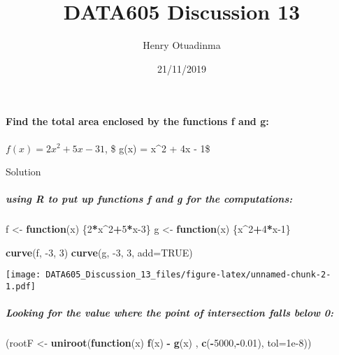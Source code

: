 \documentclass[]{article}
\title{DATA605 Discussion 13}
\author{Henry Otuadinma}
\date{21/11/2019}
\newenvironment{Shaded}{\begin{snugshade}}{\end{snugshade}}
\newcommand{\ControlFlowTok}[1]{\textcolor[rgb]{0.13,0.29,0.53}{\textbf{#1}}}
\newcommand{\DataTypeTok}[1]{\textcolor[rgb]{0.13,0.29,0.53}{#1}}
\newcommand{\DecValTok}[1]{\textcolor[rgb]{0.00,0.00,0.81}{#1}}
\newcommand{\FloatTok}[1]{\textcolor[rgb]{0.00,0.00,0.81}{#1}}
\newcommand{\KeywordTok}[1]{\textcolor[rgb]{0.13,0.29,0.53}{\textbf{#1}}}
\newcommand{\NormalTok}[1]{#1}
\newcommand{\OperatorTok}[1]{\textcolor[rgb]{0.81,0.36,0.00}{\textbf{#1}}}
\newcommand{\OtherTok}[1]{\textcolor[rgb]{0.56,0.35,0.01}{#1}}
\newcommand{\StringTok}[1]{\textcolor[rgb]{0.31,0.60,0.02}{#1}}
\let\oldparagraph\paragraph
\renewcommand{\paragraph}[1]{\oldparagraph{#1}\mbox{}}
\let\oldsubparagraph\subparagraph
\renewcommand{\subparagraph}[1]{\oldsubparagraph{#1}\mbox{}}
\begin{document}
\maketitle

\hypertarget{find-the-total-area-enclosed-by-the-functions-f-and-g}{%
\paragraph{Find the total area enclosed by the functions f and
g:}\label{find-the-total-area-enclosed-by-the-functions-f-and-g}}

\(f(x) = 2x^2 + 5x - 31\), \$ g(x) = x\^{}2 + 4x - 1\$

Solution

\hypertarget{using-r-to-put-up-functions-f-and-g-for-the-computations}{%
\subparagraph{using R to put up functions f and g for the
computations:}\label{using-r-to-put-up-functions-f-and-g-for-the-computations}}

\begin{Shaded}
\begin{Highlighting}[]
\NormalTok{f <-}\StringTok{ }\ControlFlowTok{function}\NormalTok{(x) \{}\DecValTok{2}\OperatorTok{*}\NormalTok{x}\OperatorTok{^}\DecValTok{2}\OperatorTok{+}\DecValTok{5}\OperatorTok{*}\NormalTok{x}\DecValTok{-3}\NormalTok{\}}
\NormalTok{g <-}\StringTok{ }\ControlFlowTok{function}\NormalTok{(x) \{x}\OperatorTok{^}\DecValTok{2}\OperatorTok{+}\DecValTok{4}\OperatorTok{*}\NormalTok{x}\DecValTok{-1}\NormalTok{\}}
\end{Highlighting}
\end{Shaded}

\begin{Shaded}
\begin{Highlighting}[]
\KeywordTok{curve}\NormalTok{(f, }\DecValTok{-3}\NormalTok{, }\DecValTok{3}\NormalTok{)}
\KeywordTok{curve}\NormalTok{(g, }\DecValTok{-3}\NormalTok{, }\DecValTok{3}\NormalTok{, }\DataTypeTok{add=}\OtherTok{TRUE}\NormalTok{)}
\end{Highlighting}
\end{Shaded}

\texttt{[image: DATA605\_Discussion\_13\_files/figure-latex/unnamed-chunk-2-1.pdf]}

\hypertarget{looking-for-the-value-where-the-point-of-intersection-falls-below-0}{%
\subparagraph{Looking for the value where the point of intersection
falls below
0:}\label{looking-for-the-value-where-the-point-of-intersection-falls-below-0}}

\begin{Shaded}
\begin{Highlighting}[]
\NormalTok{(rootF <-}\StringTok{ }\KeywordTok{uniroot}\NormalTok{(}\ControlFlowTok{function}\NormalTok{(x)  }\KeywordTok{f}\NormalTok{(x) }\OperatorTok{-}\StringTok{ }\KeywordTok{g}\NormalTok{(x)  , }\KeywordTok{c}\NormalTok{(}\OperatorTok{-}\DecValTok{5000}\NormalTok{,}\OperatorTok{-}\FloatTok{0.01}\NormalTok{), }\DataTypeTok{tol=}\FloatTok{1e-8}\NormalTok{)) }
\end{Highlighting}
\end{Shaded}
\end{document}
